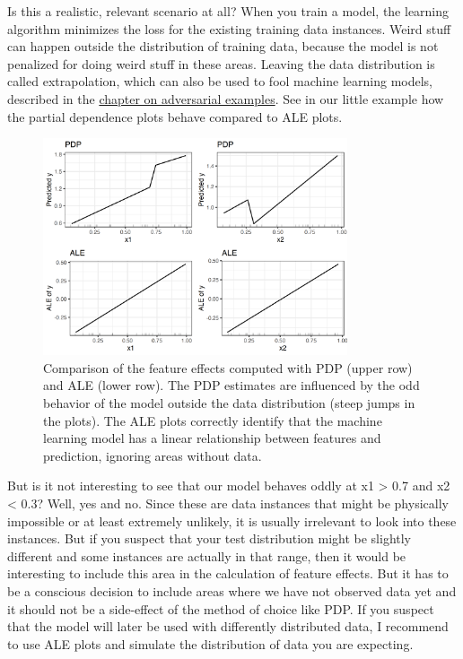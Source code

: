 \documentclass[
  11pt,
]{scrbook}
\begin{document}
Is this a realistic, relevant scenario at all?
When you train a model, the learning algorithm minimizes the loss for the existing training data instances.
Weird stuff can happen outside the distribution of training data, because the model is not penalized for doing weird stuff in these areas.
Leaving the data distribution is called extrapolation, which can also be used to fool machine learning models, described in the \protect\hyperlink{adversarial}{chapter on adversarial examples}.
See in our little example how the partial dependence plots behave compared to ALE plots.

\begin{figure}

{\centering \includegraphics[width=0.8\textwidth]{images/correlation-pdp-ale-plot-1} 

}

\caption{Comparison of the feature effects computed with PDP (upper row) and ALE (lower row). The PDP estimates are influenced by the odd behavior of the model outside the data distribution (steep jumps in the plots). The ALE plots correctly identify that the machine learning model has a linear relationship between features and prediction, ignoring areas without data.}\label{fig:correlation-pdp-ale-plot}
\end{figure}

But is it not interesting to see that our model behaves oddly at x1 \textgreater{} 0.7 and x2 \textless{} 0.3?
Well, yes and no.
Since these are data instances that might be physically impossible or at least extremely unlikely, it is usually irrelevant to look into these instances.
But if you suspect that your test distribution might be slightly different and some instances are actually in that range, then it would be interesting to include this area in the calculation of feature effects.
But it has to be a conscious decision to include areas where we have not observed data yet and it should not be a side-effect of the method of choice like PDP.
If you suspect that the model will later be used with differently distributed data, I recommend to use ALE plots and simulate the distribution of data you are expecting.
\end{document}
